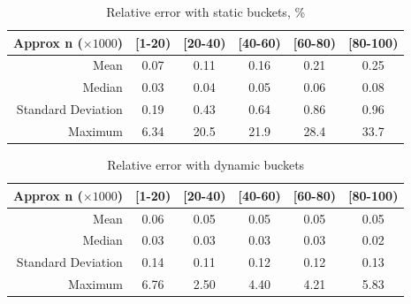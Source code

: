 \begin{table}[h]
  \vspace{4mm}
  \begin{center}
    \begin{tabular}{ r | c c c c c }
      Approx n ($\times 1000$) & {[}1-20)           & {[}20-40) & {[}40-60) & {[}60-80) & {[}80-100)    \\ \hline
                Mean               & 0.07    & 0.11     & 0.16     & 0.21     & 0.25   \\
                Median             & 0.03    & 0.04     & 0.05     & 0.06     & 0.08   \\
                Standard Deviation & 0.19    & 0.43     & 0.64     & 0.86     & 0.96   \\
                Maximum            & 6.34    & 20.5     & 21.9     & 28.4     & 33.7   \\

    \end{tabular} 
    \caption{Relative error with static buckets, \%}
    \label{table:results-a}
  \end{center} 
\end{table}

\begin{table}[h]
  \vspace{4mm}
  \begin{center}
    \begin{tabular}{ r | c c c c c }
      Approx n ($\times 1000$) & {[}1-20)           & {[}20-40) & {[}40-60) & {[}60-80) & {[}80-100)    \\ \hline               
                Mean               & 0.06    & 0.05    & 0.05    & 0.05     & 0.05 \\
                Median             & 0.03    & 0.03    & 0.03    & 0.03     & 0.02 \\
                Standard Deviation & 0.14    & 0.11    & 0.12    & 0.12     & 0.13 \\
                Maximum            & 6.76    & 2.50    & 4.40    & 4.21     & 5.83 \\
    \end{tabular} 
    \caption{Relative error with dynamic buckets}
    \label{table:results-b}
  \end{center} 
\end{table}


